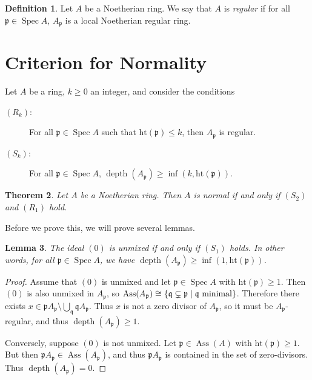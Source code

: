 \documentclass[leqno, openany]{memoir}
\newtheorem{thm}{Theorem}[section]
\newtheorem{lem}[thm]{Lemma}
\theoremstyle{definition}
\newtheorem{defn}[thm]{Definition}
\theoremstyle{remark}
\theoremstyle{plain}
\theoremstyle{definition}
\theoremstyle{remark}
\newcommand{\mf}[1]{\mathfrak{#1}}
\newcommand{\mr}[1]{\mathrm{#1}}
\DeclareMathOperator{\Spec}{Spec}
\DeclareMathOperator{\Ass}{Ass}
\DeclareMathOperator{\dpth}{depth}
\begin{document}
\begin{defn}
    Let $A$ be a Noetherian ring. We say that $A$ is \textit{regular} if for all $\mf{p} \in \Spec A$, $A_{\mf{p}}$ is a local Noetherian regular ring. 
\end{defn}

\section{Criterion for Normality}%
\label{sec:criterion_for_normality}

Let $A$ be a ring, $k \geq 0$ an integer, and consider the conditions
\begin{description}
    \item[$(R_k)$:] For all $\mf{p} \in \Spec A$ such that $\mr{ht}(\mf{p}) \leq k$, then $A_{\mf{p}}$ is regular.
    \item[$(S_k)$:] For all $\mf{p} \in \Spec A$, $\dpth(A_{\mf{p}}) \geq \inf (k, \mr{ht}(\mf{p}))$.
\end{description}

\begin{thm}\label{thm:normalcrit}
    Let $A$ be a Noetherian ring. Then $A$ is normal if and only if $(S_2)$ and $(R_1)$ hold.
\end{thm}

Before we prove this, we will prove several lemmas.

\begin{lem}
    The ideal $(0)$ is unmixed if and only if $(S_1)$ holds. In other words, for all $\mf{p} \in \Spec A$, we have $\dpth(A_{\mf{p}}) \geq \inf(1, \mr{ht}(\mf{p}))$.
\end{lem}

\begin{proof}
    Assume that $(0)$ is unmixed and let $\mf{p} \in \Spec A$ with $\mr{ht}(\mf{p}) \geq 1$. Then $(0)$ is also unmixed in $A_{\mf{p}}$, so $\Ass(A_{\mf{p}}) \cong \qty{\mf{q} \subsetneq \mf{p} \mid \mf{q} \text{ minimal}}$. Therefore there exists $x \in \mf{p} A_{\mf{p}} \setminus \bigcup_{\mf{q}} \mf{q} A_{\mf{p}}$. Thus $x$ is not a zero divisor of $A_{\mf{p}}$, so it must be $A_{\mf{p}}$-regular, and thus $\dpth(A_{\mf{p}}) \geq 1$.

    Conversely, suppose $(0)$ is not unmixed. Let $\mf{p} \in \Ass(A)$ with $\mr{ht}(\mf{p}) \geq 1$. But then $\mf{p} A_{\mf{p}} \in \Ass(A_{\mf{p}})$, and thus $\mf{p} A_{\mf{p}}$ is contained in the set of zero-divisors. Thus $\dpth(A_{\mf{p}}) = 0$.
\end{proof}
\end{document}
